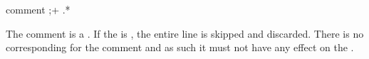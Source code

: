 \begin{identifier}{comment}
;+ .*
\end{identifier} 

The comment is a . If the   is , the entire line is skipped and discarded. There is no corresponding  for the comment  and as such it must not have any effect on the . \\

\begin{examples}
\end{examples}

